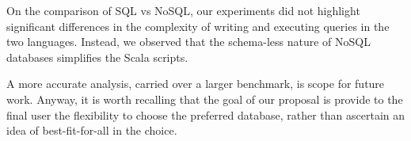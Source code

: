 On the comparison of SQL vs NoSQL, our experiments did not highlight significant differences in the complexity of writing and executing queries in the two languages. Instead, we observed that the schema-less nature of NoSQL databases simplifies the Scala scripts.

A more accurate analysis, carried over a larger benchmark, is scope for future work. Anyway, it is worth recalling that the goal of our proposal is provide to the final user the flexibility to choose the preferred database, rather than ascertain an idea of best-fit-for-all in the choice.